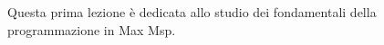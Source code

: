 \documentclass[11pt]{article}
\begin{document}
\begin{minipage}{0.55\linewidth}
\vspace{0.3cm}
{\large{\textbf{}}}\\\end{minipage}

\vspace{0.3cm}
\begin{minipage}{0.95\linewidth}
\begin{center}
{\huge{\textbf{}}} \\
\end{center}
\end{minipage}
\vspace*{0.2cm}


\begin{center}
\begin{minipage}[c]{14cm}
\begin{textit}

Questa prima lezione è dedicata allo studio dei fondamentali della programmazione in Max Msp.

\end{textit}
\end{minipage}
\end{center}
\vspace*{0.2cm}

\setlength{\columnsep}{1.5em}
\end{document}

